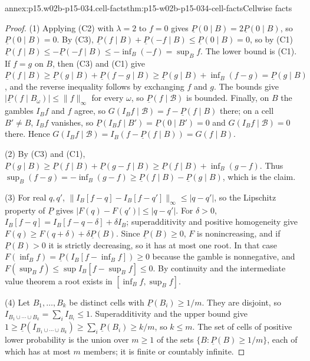 \begin{annexitem}{annex:p15.w02b-p15-034.cell-facts}{thm:p15-w02b-p15-034-cell-facts}{Cellwise facts}
\begin{proof}
(1) Applying (C2) with \(\lambda=2\) to \(f=0\) gives
\(\underline P(0\mid B)=2\underline P(0\mid B)\), so
\(\underline P(0\mid B)=0\). By (C3),
\(\underline P(f\mid B)+\underline P(-f\mid B)\leq\underline P(0\mid B)=0\),
so by (C1)
\(\underline P(f\mid B)\leq-\underline P(-f\mid B)\leq-\inf_B(-f)=\sup_Bf\).
The lower bound is (C1). If \(f=g\) on \(B\), then (C3) and (C1) give
\(\underline P(f\mid B)\geq\underline P(g\mid B)+\underline P(f-g\mid B)
\geq\underline P(g\mid B)+\inf_B(f-g)=\underline P(g\mid B)\), and the
reverse inequality follows by exchanging \(f\) and \(g\). The bounds give
\(|\underline P(f\mid B_\omega)|\leq\|f\|_\infty\) for every \(\omega\), so
\(\underline P(f\mid\mathcal B)\) is bounded. Finally, on \(B\) the gambles
\(I_Bf\) and \(f\) agree, so \(G(I_Bf\mid\mathcal B)=f-\underline P(f\mid B)\)
there; on a cell \(B'\ne B\), \(I_Bf\) vanishes, so
\(\underline P(I_Bf\mid B')=\underline P(0\mid B')=0\) and
\(G(I_Bf\mid\mathcal B)=0\) there. Hence
\(G(I_Bf\mid\mathcal B)=I_B(f-\underline P(f\mid B))=G(f\mid B)\).

(2) By (C3) and (C1),
\(\underline P(g\mid B)\geq\underline P(f\mid B)+\underline P(g-f\mid B)
\geq\underline P(f\mid B)+\inf_B(g-f)\). Thus
\(\sup_B(f-g)=-\inf_B(g-f)\geq\underline P(f\mid B)-\underline P(g\mid B)\),
which is the claim.

(3) For real \(q,q'\),
\(\|I_B[f-q]-I_B[f-q']\|_\infty\leq|q-q'|\), so the Lipschitz property of
\(\underline P\) gives \(|F(q)-F(q')|\leq|q-q'|\). For \(\delta>0\),
\(I_B[f-q]=I_B[f-q-\delta]+\delta I_B\); superadditivity and positive
homogeneity give \(F(q)\geq F(q+\delta)+\delta\underline P(B)\). Since
\(\underline P(B)\geq0\), \(F\) is nonincreasing, and if
\(\underline P(B)>0\) it is strictly decreasing, so it has at most one
root. In that case \(F(\inf_Bf)=\underline P(I_B[f-\inf_Bf])\geq0\) because
the gamble is nonnegative, and \(F(\sup_Bf)\leq\sup I_B[f-\sup_Bf]\leq0\).
By continuity and the intermediate value theorem a root exists in
\([\inf_Bf,\sup_Bf]\).

(4) Let \(B_1,\ldots,B_k\) be distinct cells with
\(\underline P(B_i)\geq1/m\). They are disjoint, so
\(I_{B_1\cup\cdots\cup B_k}=\sum_iI_{B_i}\leq1\). Superadditivity and the
upper bound give
\(1\geq\underline P(I_{B_1\cup\cdots\cup B_k})\geq\sum_i\underline P(B_i)\geq k/m\),
so \(k\leq m\). The set of cells of positive lower probability is the union
over \(m\geq1\) of the sets \(\{B:\underline P(B)\geq1/m\}\), each of which
has at most \(m\) members; it is finite or countably infinite.


\end{proof}
\end{annexitem}
